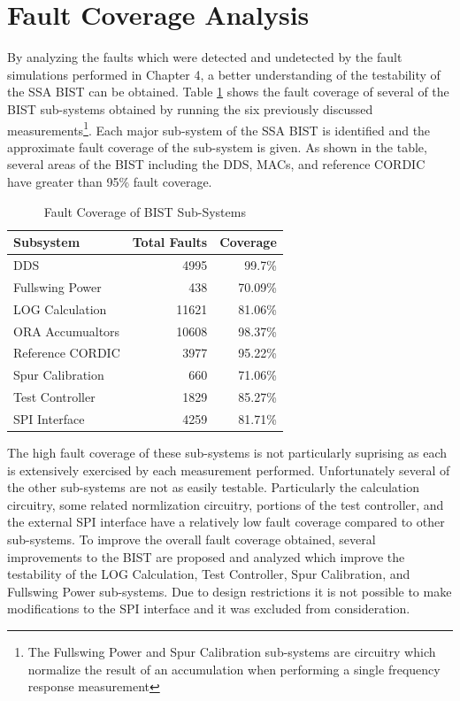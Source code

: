 \documentclass[12pt]{report}
\begin{document}
\section{Fault Coverage Analysis}
By analyzing the faults which were detected and undetected by the fault simulations performed in Chapter 4, a better understanding of the testability of the SSA BIST can be obtained.  Table \ref{tbl:faultsubsystems} shows the fault coverage of several of the BIST sub-systems obtained by running the six previously discussed measurements\footnote{The Fullswing Power and Spur Calibration sub-systems are circuitry which normalize the result of an accumulation when performing a single frequency response measurement}. Each major sub-system of the SSA BIST is identified and the approximate fault coverage of the sub-system is given.  As shown in the table, several areas of the BIST including the DDS, MACs, and reference CORDIC have greater than 95\% fault coverage.  
\begin{table}
  \begin{center}
    \caption{Fault Coverage of BIST Sub-Systems}
    \label{tbl:faultsubsystems}

    \begin{tabular}{|l|r|r|}
      \hline
      Subsystem & Total Faults & Coverage \\ \hline
      DDS & 4995 & 99.7\% \\ \hline
      Fullswing Power & 438 & 70.09\% \\ \hline
      LOG Calculation & 11621 & 81.06\% \\ \hline
      ORA Accumualtors & 10608 & 98.37\% \\ \hline
      Reference CORDIC & 3977 & 95.22\% \\ \hline
      Spur Calibration & 660 & 71.06\% \\ \hline
      Test Controller & 1829 & 85.27\% \\ \hline
      SPI Interface & 4259 & 81.71\% \\
      \hline
    \end{tabular}
  \end{center}
\end{table}
The high fault coverage of these sub-systems is not particularly suprising as each is extensively exercised by each measurement performed.  Unfortunately several of the other sub-systems are not as easily testable.  Particularly the calculation circuitry, some related normlization circuitry, portions of the test controller, and the external SPI interface have a relatively low fault coverage compared to other sub-systems.  To improve the overall fault coverage obtained, several improvements to the BIST are proposed and analyzed which improve the testability of the LOG Calculation, Test Controller, Spur Calibration, and Fullswing Power sub-systems.  Due to design restrictions it is not possible to make modifications to the SPI interface and it was excluded from consideration.
\end{document}
